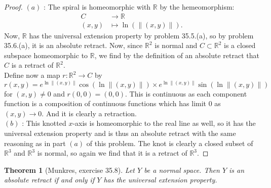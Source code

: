 \documentclass[reqno]{amsart}
\theoremstyle{plain}%
\newtheorem{theorem}{Theorem}[section]
\theoremstyle{definition}
\theoremstyle{remark}
\begin{document}
\begin{proof}
    $(a)$ : The spiral is homeomorphic with $\mathbb{R}$ by the hemeomorphism:
    \begin{align*}
        C &\to \mathbb{R}\\
        \left( x,y \right) &\mapsto \ln \left( \| (x,y) \| \right).
    \end{align*}
    Now, $\mathbb{R}$ has the universal extension property by problem
    35.5.(a), so by problem 35.6.(a), it is an absolute retract.
    Now, since $\mathbb{R}^2$ is normal and $C \subset \mathbb{R}^2$ is
    a closed subspace homeomorphic to $\mathbb{R}$, we find by the definition
    of an absolute retract that $C$ is a retract of $\mathbb{R}^2$.\\
    \linebreak
    Define now a map
    $r  \colon \mathbb{R}^2 \to C$ by
    \[
    r\left( x,y \right) = e^{ \ln \| (x,y)\|} \cos \left( \ln \|(x,y)\| \right)
    \times 
    e^{\ln \| (x,y) \|} \sin \left( \ln \|(x,y)\| \right) 
    \] 
    for $(x,y) \neq 0$ and
    $r\left( 0,0 \right) = (0,0)$. This is continuous as each component
    function is a composition of continuous functions which has limit $0$ as
    $(x,y) \to 0$. And it is clearly a retraction.\\
    \linebreak
    $(b)$ : This knotted $x$-axis is homeomorphic to the real line as well, so
    it has the universal extension property and is thus an absolute retract
    with the same reasoning as in part $(a)$ of this problem. The knot is
    clearly a closed subset of $\mathbb{R}^3$ and $\mathbb{R}^3$ is normal, so
    again we find that it is a retract of $\mathbb{R}^3$.
\end{proof}

\begin{theorem}[Munkres, exercise 35.8]
    Let $Y$ be a normal space. Then $Y$ is an absolute retract if and only
    if $Y$ has the universal extension property.
\end{theorem}
\end{document}
